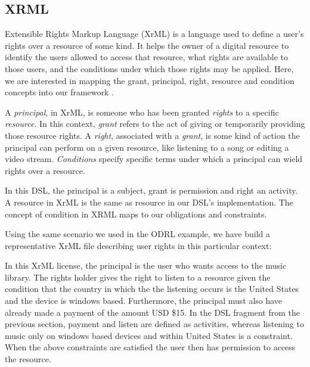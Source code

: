 \subsection{XRML}\label{sec:model-xrml}
Extensible Rights Markup Language (XrML) is a language used to define a user's rights over a resource of some kind. It helps the owner of a digital resource to identify the users allowed to access that resource, what rights are available to those users, and the conditions under which those rights may be applied. Here, we are interested in mapping the grant, principal, right, resource and condition concepts into our framework \cite{XrML-spec}.

A \emph{principal}, in XrML, is someone who has been granted \emph{rights} to a specific \emph{resource}.  In this context, \emph{grant} refers to the act of giving or temporarily providing those resource rights.  A \emph{right}, associated with a \emph{grant}, is some kind of action the principal can perform on a given resource, like listening to a song or editing a video stream.  \emph{Conditions} specify specific terms under which a principal can wield rights over a resource.

In this DSL, the principal is a subject, grant is permission and right an activity. A resource in XrML is the same as resource in our DSL's implementation. The concept of condition in XRML maps to our obligations and constraints.

Using the same scenario we used in the ODRL example, we have build a representative XrML file describing user rights in this particular context:



In this XrML license, the principal is the user who wants access to the music library. The rights holder gives the right to listen to a resource given the condition that the country in which the the listening occurs is the United States and the device is windows based. Furthermore, the principal must also have already made a payment of the amount USD \$15.  In the DSL fragment from the previous section, payment and listen are defined as activities, whereas listening to music only on windows based devices and within United States is a constraint. When the above constraints are satisfied the user then has permission to access the resource.
